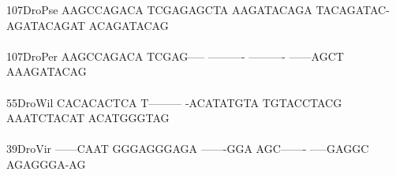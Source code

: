 \documentclass[11pt,twoside,reqno,a4paper]{article}
\begin{document}
{107\hspace*{1\charwidth}DroPse	AAGCCAGACA	TCGAGAGCTA	AAGATACAGA	TACAGATAC-	AGATACAGAT	ACAGATACAG	\\
\hspace*{4\charwidth}\hspace*{7\charwidth}\hspace*{1\charwidth}\hspace*{1\charwidth}\hspace*{1\charwidth}\hspace*{1\charwidth}\hspace*{1\charwidth}\hspace*{1\charwidth}\\
107\hspace*{1\charwidth}DroPer	AAGCCAGACA	TCGAG-----	----------	----------	------AGCT	AAAGATACAG	\\
\hspace*{4\charwidth}\hspace*{7\charwidth}\hspace*{1\charwidth}\hspace*{1\charwidth}\hspace*{1\charwidth}\hspace*{1\charwidth}\hspace*{1\charwidth}\hspace*{1\charwidth}\\
55\hspace*{2\charwidth}DroWil	CACACACTCA	T---------	-ACATATGTA	TGTACCTACG	AAATCTACAT	ACATGGGTAG	\\
\hspace*{4\charwidth}\hspace*{7\charwidth}\hspace*{1\charwidth}\hspace*{1\charwidth}\hspace*{1\charwidth}\hspace*{1\charwidth}\hspace*{1\charwidth}\hspace*{1\charwidth}\\
39\hspace*{2\charwidth}DroVir	------CAAT	GGGAGGGAGA	-------GGA	AGC-------	-----GAGGC	AGAGGGA-AG	\\
\hspace*{4\charwidth}\hspace*{7\charwidth}\hspace*{1\charwidth}\hspace*{1\charwidth}\hspace*{1\charwidth}\hspace*{1\charwidth}\hspace*{1\charwidth}\hspace*{1\charwidth}\\
}
\end{document}
